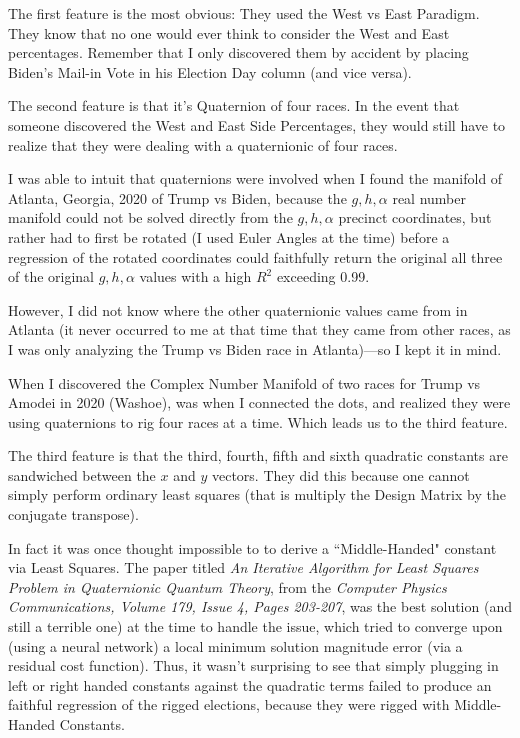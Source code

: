 \documentclass[preprint,13pt]{elsarticle}
\begin{document}
The first feature is the most obvious: They used the West vs East Paradigm. They know that no one would ever think to consider the West and East percentages. Remember that I only discovered them by accident by placing Biden's Mail-in Vote in his Election Day column (and vice versa).

The second feature is that it's Quaternion of four races. In the event that someone discovered the West and East Side Percentages, they would still have to realize that they were dealing with a quaternionic of four races.

I was able to intuit that quaternions were involved when I found the manifold of Atlanta, Georgia, 2020 of Trump vs Biden, because the $g,h,\alpha$ real number manifold could not be solved directly from the $g,h,\alpha$ precinct coordinates, but rather had to first be rotated (I used Euler Angles at the time) before a regression of the rotated coordinates could faithfully return the original all three of the original $g,h,\alpha$ values with a high $R^2$ exceeding 0.99.

However, I did not know where the other quaternionic values came from in Atlanta (it never occurred to me at that time that they came from other races, as I was only analyzing the Trump vs Biden race in Atlanta)---so I kept it in mind.

When I discovered the Complex Number Manifold of two races for Trump vs Amodei in 2020 (Washoe), was when I connected the dots, and realized they were using quaternions to rig four races at a time. Which leads us to the third feature.

The third feature is that the third, fourth, fifth and sixth quadratic constants are sandwiched between the $x$ and $y$ vectors. They did this because one cannot simply perform ordinary least squares (that is multiply the Design Matrix by the conjugate transpose). 

In fact it was once thought impossible to to derive a ``Middle-Handed" constant via Least Squares. The paper titled \textit{An Iterative Algorithm for Least Squares Problem in Quaternionic Quantum Theory}, from the \textit{Computer Physics Communications, Volume 179, Issue 4, Pages 203-207}, was the best solution (and still a terrible one) at the time to handle the issue, which tried to converge upon (using a neural network) a local minimum solution magnitude error (via a residual cost function).
\newpage
Thus, it wasn't surprising to see that simply plugging in left or right handed constants against the quadratic terms failed to produce an faithful regression of the rigged elections, because they were rigged with Middle-Handed Constants. 
\end{document}
